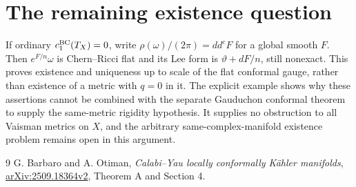 \documentclass[11pt]{article}
\newcommand{\ddc}{dd^c}
\begin{document}
\section{The remaining existence question}
If ordinary $c_1^{\rm BC}(T_X)=0$, write
$\rho(\omega)/(2\pi)=\ddc F$ for a global smooth $F$.
Then $e^{F/n}\omega$ is Chern--Ricci flat and its Lee form is
$\vartheta+dF/n$, still nonexact. This proves existence and
uniqueness up to scale of the flat conformal gauge, rather than
existence of a metric with $q=0$ in it. The explicit example
shows why these assertions cannot be combined with the separate
Gauduchon conformal theorem to supply the same-metric rigidity
hypothesis. It supplies no obstruction to all Vaisman metrics on
$X$, and the arbitrary same-complex-manifold existence problem
remains open in this argument.
\begin{thebibliography}{9}
 G. Barbaro and A. Otiman,
\emph{Calabi--Yau locally conformally K\"ahler manifolds},
\href{https://arxiv.org/abs/2509.18364v2}{arXiv:2509.18364v2},
Theorem A and Section 4.
\end{thebibliography}
\end{document}
